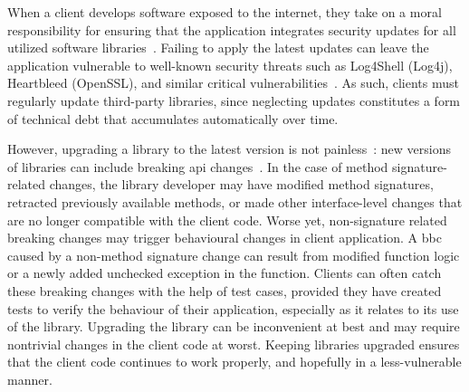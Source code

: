 When a client develops software exposed to the internet, they take on a moral responsibility for ensuring that the
application integrates security updates for all utilized software libraries~\cite{wu23:_under_threat_upstr_vulner_downs}.
Failing to apply the latest updates can leave the application vulnerable to well-known security threats
such as Log4Shell (Log4j), Heartbleed (OpenSSL), and similar critical vulnerabilities~\cite{haryono22:_autom_ident_librar_vulner_data,zhan21:_atvhun,alfadel23:_empir_python}.
As such, clients must regularly update third-party libraries, since neglecting updates constitutes a
form of technical debt that accumulates automatically over time.





However, upgrading a library to the latest version is not painless~\cite{elizalde18:_towar_smoot_librar_migrat,derr17:_keep,dann23:_upcy}:
new versions of libraries can include breaking \gls{api} changes~\cite{dietrich14:_broken}. In the case
of method signature-related changes, the library developer may have modified method signatures,
retracted previously available methods, or made other interface-level changes that are no longer
compatible with the client code. Worse yet, non-signature related breaking changes may trigger behavioural
changes in client application.
A \gls{bbc} caused by a non-method signature change can result from modified function logic or
a newly added unchecked exception in the function.
Clients can often catch these breaking changes with the help of test cases, provided they have created
tests to verify the behaviour of their application, especially as it relates to its
use of the library.
Upgrading the library can be inconvenient at best and may require nontrivial changes in the client
code at worst. Keeping libraries upgraded ensures that the client code
continues to work properly, and hopefully in a less-vulnerable manner.

